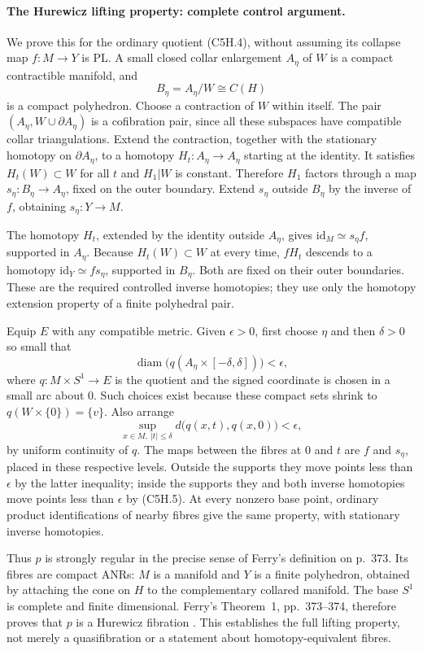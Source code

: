 \paragraph{The Hurewicz lifting property: complete control argument.}
We prove this for the ordinary quotient (C5H.4), without assuming its
collapse map $f:M\to Y$ is PL.  A small closed collar enlargement $A_\eta$ of
$W$ is a compact contractible manifold, and
\[
 B_\eta=A_\eta/W\cong C(H)
\]
is a compact polyhedron.  Choose a contraction of $W$ within itself.
The pair $(A_\eta,W\cup\partial A_\eta)$ is a cofibration pair, since all
these subspaces have compatible collar triangulations.  Extend the
contraction, together with the stationary homotopy on $\partial A_\eta$,
to a homotopy $H_t:A_\eta\to A_\eta$ starting at the identity.  It satisfies
$H_t(W)\subset W$ for all $t$ and $H_1|W$ is constant.  Therefore $H_1$
factors through a map $s_\eta:B_\eta\to A_\eta$, fixed on the outer
boundary.  Extend $s_\eta$ outside $B_\eta$ by the inverse of $f$, obtaining
$s_\eta:Y\to M$.

The homotopy $H_t$, extended by the identity outside $A_\eta$, gives
$\mathrm{id}_M\simeq s_\eta f$, supported in $A_\eta$.  Because
$H_t(W)\subset W$ at every time, $fH_t$ descends to a homotopy
$\mathrm{id}_Y\simeq f s_\eta$, supported in $B_\eta$.  Both are fixed on
their outer boundaries.  These are the required controlled inverse
homotopies; they use only the homotopy extension property of a finite
polyhedral pair.

Equip $E$ with any compatible metric.  Given $\epsilon>0$, first choose
$\eta$ and then $\delta>0$ so small that
\[
 \operatorname{diam}\bigl(q(A_\eta\times[-\delta,\delta])\bigr)<\epsilon,
 \tag{C5H.5}
\]
where $q:M\times S^1\to E$ is the quotient and the signed coordinate is
chosen in a small arc about $0$.  Such choices exist because these compact
sets shrink to $q(W\times\{0\})=\{v\}$.  Also arrange
\[
 \sup_{x\in M,\ |t|\le\delta}
    d\bigl(q(x,t),q(x,0)\bigr)<\epsilon,
\]
by uniform continuity of $q$.  The maps between the fibres at $0$ and $t$
are $f$ and $s_\eta$, placed in these respective levels.  Outside the
supports they move points less than $\epsilon$ by the latter inequality;
inside the supports they and both inverse homotopies move points less than
$\epsilon$ by (C5H.5).  At every nonzero base point, ordinary product
identifications of nearby fibres give the same property, with stationary
inverse homotopies.

Thus $p$ is strongly regular in the precise sense of Ferry's definition on
p.~373.  Its fibres are compact ANRs: $M$ is a manifold and $Y$ is a finite
polyhedron, obtained by attaching the cone on $H$ to the complementary
collared manifold.  The base $S^1$ is complete and finite dimensional.
Ferry's Theorem~1, pp.~373--374, therefore proves that $p$ is a Hurewicz
fibration \cite{C5HFerry1978}.  This establishes the full lifting property,
not merely a quasifibration or a statement about homotopy-equivalent fibres.


